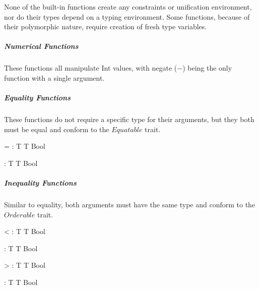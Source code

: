 \documentclass[class=article, crop=false]{standalone}
\begin{document}
None of the built-in functions create any constraints or unification environment, nor do their types depend on a typing environment.
Some functions, because of their polymorphic nature, require creation of fresh type variables.

\subparagraph{Numerical Functions}

These functions all manipulate Int values, with negate ($-$) being the only function with a single argument.






\subparagraph{Equality Functions}

These functions do not require a specific type for their arguments, but they both must be equal and conform to the $Equatable$ trait.

    {\Gamma \vdash = : T \rightarrow T \rightarrow \mbox{Bool}}

    {\Gamma \vdash \neq : T \rightarrow T \rightarrow \mbox{Bool}}

\subparagraph{Inequality Functions}

Similar to equality, both arguments must have the same type and conform to the $Orderable$ trait.

    {\Gamma \vdash < : T \rightarrow T \rightarrow \mbox{Bool}}

    {\Gamma \vdash \leq : T \rightarrow T \rightarrow \mbox{Bool}}

    {\Gamma \vdash > : T \rightarrow T \rightarrow \mbox{Bool}}

    {\Gamma \vdash \geq : T \rightarrow T \rightarrow \mbox{Bool}}
\end{document}
